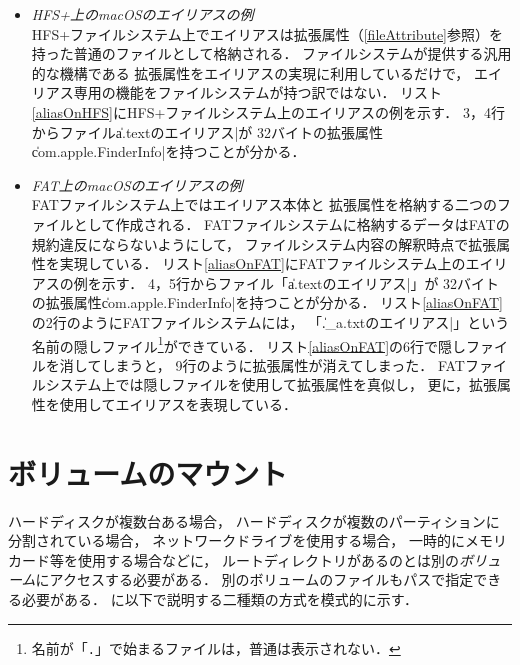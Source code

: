 \begin{itemize}
  \begin{itemize}
  \item \emph{HFS+上のmacOSのエイリアスの例} \\
    HFS+ファイルシステム上でエイリアスは拡張属性（\ref{fileAttribute}参照）を
    持った普通のファイルとして格納される．
    ファイルシステムが提供する汎用的な機構である
    拡張属性をエイリアスの実現に利用しているだけで，
    エイリアス専用の機能をファイルシステムが持つ訳ではない．
    リスト\ref{aliasOnHFS}にHFS+ファイルシステム上のエイリアスの例を示す．
    3，4行からファイル\|a.textのエイリアス|が
    32バイトの拡張属性\|com.apple.FinderInfo|を持つことが分かる．

    

  \item \emph{FAT上のmacOSのエイリアスの例} \\
    FATファイルシステム上ではエイリアス本体と
    拡張属性を格納する二つのファイルとして作成される．
    FATファイルシステムに格納するデータはFATの規約違反にならないようにして，
    ファイルシステム内容の解釈時点で拡張属性を実現している．
    リスト\ref{aliasOnFAT}にFATファイルシステム上のエイリアスの例を示す．
    4，5行からファイル「\|a.textのエイリアス|」が
    32バイトの拡張属性\|com.apple.FinderInfo|を持つことが分かる．
    リスト\ref{aliasOnFAT}の2行のようにFATファイルシステムには，
    「\|._a.txtのエイリアス|」という名前の隠しファイル\footnote{
      名前が「\texttt{.}」で始まるファイルは，普通は表示されない．
    }ができている．
    リスト\ref{aliasOnFAT}の6行で隠しファイルを消してしまうと，
    9行のように拡張属性が消えてしまった．
    FATファイルシステム上では隠しファイルを使用して拡張属性を真似し，
    更に，拡張属性を使用してエイリアスを表現している．

    

  \end{itemize}
\end{itemize}

\section{ボリュームのマウント}
ハードディスクが複数台ある場合，
ハードディスクが複数のパーティションに分割されている場合，
ネットワークドライブを使用する場合，
一時的にメモリカード等を使用する場合などに，
ルートディレクトリがあるのとは別の\emph{ボリューム}にアクセスする必要がある．
別のボリュームのファイルもパスで指定できる必要がある．
に以下で説明する二種類の方式を模式的に示す．

